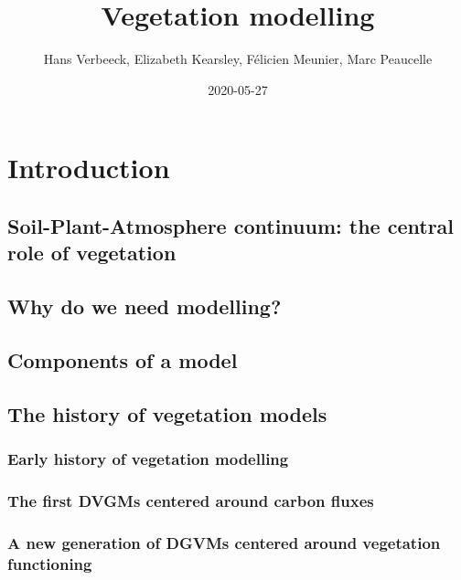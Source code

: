 \documentclass[]{book}
\title{Vegetation modelling}
\author{Hans Verbeeck, Elizabeth Kearsley, Félicien Meunier, Marc Peaucelle}
\date{2020-05-27}
\begin{document}
\maketitle

{
\setcounter{tocdepth}{1}
\tableofcontents
}
\chapter{Introduction}\label{intro}

\section{Soil-Plant-Atmosphere continuum: the central role of
vegetation}\label{soil-plant-atmosphere-continuum-the-central-role-of-vegetation}

\section{Why do we need modelling?}\label{why-do-we-need-modelling}

\section{Components of a model}\label{components-of-a-model}

\section{The history of vegetation
models}\label{the-history-of-vegetation-models}

\subsection{Early history of vegetation
modelling}\label{early-history-of-vegetation-modelling}

\subsection{The first DVGMs centered around carbon
fluxes}\label{the-first-dvgms-centered-around-carbon-fluxes}

\subsection{A new generation of DGVMs centered around vegetation
functioning}\label{a-new-generation-of-dgvms-centered-around-vegetation-functioning}
\end{document}
